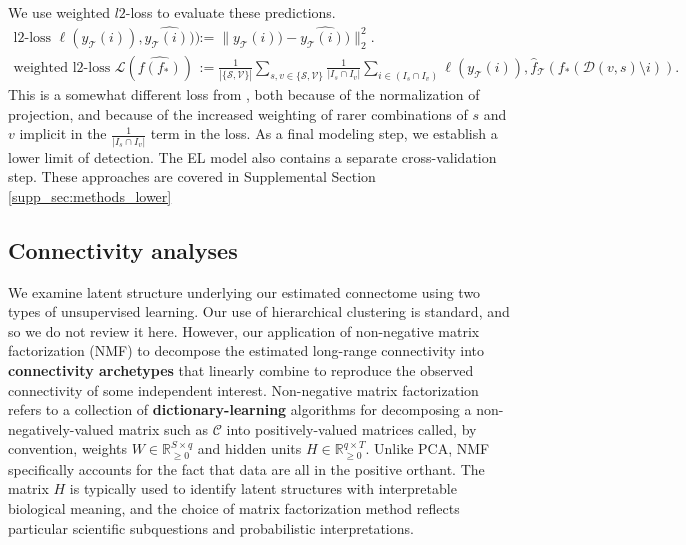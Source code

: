 We use weighted $l2$-loss to evaluate these predictions.
\begin{align*}
\text{l2-loss } \ell (y_{\mathcal T}(i)),\widehat {y_{\mathcal T}(i))}) &:=   \| y_{\mathcal T} (i)) - \widehat {y_{\mathcal T}(i))} \|_2^2. \\
\text{weighted l2-loss } \mathcal L ( \widehat {f(f_*)}) &:= \frac{1}{|\{\mathcal S,\mathcal V\}|} \sum_{s,v \in \{\mathcal S,\mathcal V\}} \frac{1}{ |I_{s} \cap I_v |} \sum_{i \in (I_{s} \cap I_v ) } \ell (y_{\mathcal T}(i)), \hat f_{\mathcal T} (f_*(\mathcal D(v,s) \setminus i)) .
\end{align*}
This is a somewhat different loss from \citet{Knox2019-ot}, both because of the normalization of projection, and because of the increased weighting of rarer combinations of $s$ and $v$ implicit in the $\frac{1}{ |I_{s} \cap I_v |}$ term in the loss.
As a final modeling step, we establish a lower limit of detection.
The EL model also contains a separate cross-validation step.
These approaches are covered in Supplemental Section \ref{supp_sec:methods_lower}

\newpage

\subsection{Connectivity analyses}

We examine latent structure underlying our estimated connectome using two types of unsupervised learning.
Our use of hierarchical clustering is standard, and so we do not review it here.
However, our application of non-negative matrix factorization (NMF) to decompose the estimated long-range connectivity into \textbf{connectivity archetypes} that linearly combine to reproduce the observed connectivity of some independent interest.
Non-negative matrix factorization refers to a collection of \textbf{dictionary-learning} algorithms for decomposing a non-negatively-valued matrix such as $\mathcal C $ into positively-valued matrices called, by convention, weights $W \in \mathbb R^{S \times q}_{\geq 0}$ and hidden units $H \in \mathbb R^{q  \times T}_{\geq 0}$.
Unlike PCA, NMF specifically accounts for the fact that data are all in the positive orthant.
The matrix $H$ is typically used to identify latent structures with interpretable biological meaning, and the choice of matrix factorization method reflects particular scientific subquestions and probabilistic interpretations. 

